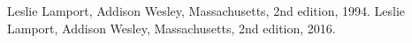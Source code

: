   Leslie Lamport,
  Addison Wesley, Massachusetts,
  2nd edition,
  1994.
  Leslie Lamport,
  Addison Wesley, Massachusetts,
  2nd edition,
  2016.